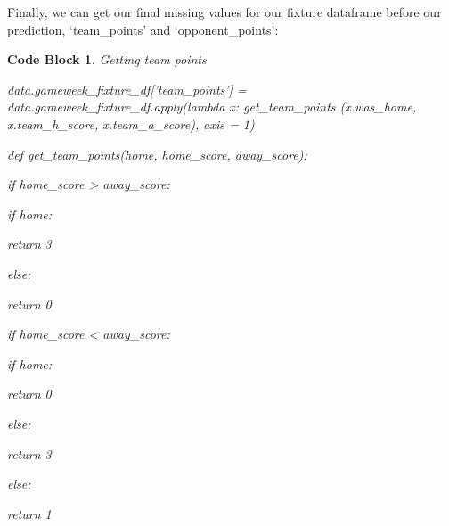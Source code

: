 \documentclass[12pt, a4paper, oneside]{book}
\newtheorem{codeblock}[theorem]{Code Block}
\numberwithin{equation}{section}
\begin{document}
\vspace{0.5cm}

Finally, we can get our final missing values for our fixture dataframe before our prediction, `team\_points' and `opponent\_points':

\begin{codeblock}
  Getting team points

  data.gameweek\_fixture\_df['team\_points'] = data.gameweek\_fixture\_df.apply(lambda x: get\_team\_points (x.was\_home, x.team\_h\_score, x.team\_a\_score), axis = 1)

  def get\_team\_points(home, home\_score, away\_score):
  
  \hspace{\parindent}if home\_score > away\_score:
  
  \hspace{\parindent}\hspace{\parindent}if home:
  
  \hspace{\parindent}\hspace{\parindent}\hspace{\parindent}return 3
  
  \hspace{\parindent}\hspace{\parindent}else: 
  
  \hspace{\parindent}\hspace{\parindent}\hspace{\parindent}return 0
  
  \hspace{\parindent}if home\_score < away\_score:
  
  \hspace{\parindent}\hspace{\parindent}if home:
  
  \hspace{\parindent}\hspace{\parindent}\hspace{\parindent}return 0
  
  \hspace{\parindent}\hspace{\parindent}else: 
  
  \hspace{\parindent}\hspace{\parindent}\hspace{\parindent}return 3
  
  \hspace{\parindent}else:
  
  \hspace{\parindent}\hspace{\parindent}return 1
\end{codeblock}
\end{document}

